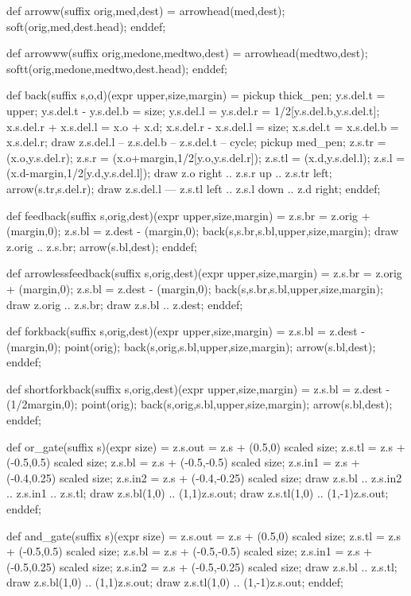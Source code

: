def arroww(suffix orig,med,dest) =
 arrowhead(med,dest); soft(orig,med,dest.head);
enddef;

def arrowww(suffix orig,medone,medtwo,dest) =
 arrowhead(medtwo,dest); softt(orig,medone,medtwo,dest.head);
enddef;

def back(suffix s,o,d)(expr upper,size,margin) =
 pickup thick_pen;
 y.s.del.t = upper; y.s.del.t - y.s.del.b = size;
 y.s.del.l = y.s.del.r = 1/2[y.s.del.b,y.s.del.t];
 x.s.del.r + x.s.del.l = x.o + x.d;
 x.s.del.r - x.s.del.l = size;
 x.s.del.t = x.s.del.b = x.s.del.r;
 draw z.s.del.l -- z.s.del.b -- z.s.del.t -- cycle;
 pickup med_pen;
 z.s.tr = (x.o,y.s.del.r);
 z.s.r =  (x.o+margin,1/2[y.o,y.s.del.r]);
 z.s.tl = (x.d,y.s.del.l);
 z.s.l =  (x.d-margin,1/2[y.d,y.s.del.l]);
 draw z.o {right} .. z.s.r {up} .. z.s.tr {left};
 arrow(s.tr,s.del.r);
 draw z.s.del.l --- z.s.tl {left} .. z.s.l {down} .. z.d {right};
enddef;

def feedback(suffix s,orig,dest)(expr upper,size,margin) =
 z.s.br = z.orig + (margin,0); z.s.bl = z.dest - (margin,0);
 back(s,s.br,s.bl,upper,size,margin);
 draw z.orig .. z.s.br; arrow(s.bl,dest);
enddef;

def arrowlessfeedback(suffix s,orig,dest)(expr upper,size,margin) =
 z.s.br = z.orig + (margin,0); z.s.bl = z.dest - (margin,0);
 back(s,s.br,s.bl,upper,size,margin);
 draw z.orig .. z.s.br; draw z.s.bl .. z.dest;
enddef;

def forkback(suffix s,orig,dest)(expr upper,size,margin) =
 z.s.bl = z.dest - (margin,0); point(orig);
 back(s,orig,s.bl,upper,size,margin); arrow(s.bl,dest);
enddef;

def shortforkback(suffix s,orig,dest)(expr upper,size,margin) =
 z.s.bl = z.dest - (1/2margin,0); point(orig);
 back(s,orig,s.bl,upper,size,margin); arrow(s.bl,dest);
enddef;


def or_gate(suffix s)(expr size) =
 z.s.out = z.s + (0.5,0) scaled size;
 z.s.tl = z.s + (-0.5,0.5) scaled size;
 z.s.bl = z.s + (-0.5,-0.5) scaled size;
 z.s.in1 = z.s + (-0.4,0.25) scaled size;
 z.s.in2 = z.s + (-0.4,-0.25) scaled size;
 draw z.s.bl .. z.s.in2 .. z.s.in1 .. z.s.tl;
 draw z.s.bl{(1,0)} .. {(1,1)}z.s.out;
 draw z.s.tl{(1,0)} .. {(1,-1)}z.s.out;
enddef;

def and_gate(suffix s)(expr size)  =
 z.s.out = z.s + (0.5,0) scaled size;
 z.s.tl = z.s + (-0.5,0.5) scaled size;
 z.s.bl = z.s + (-0.5,-0.5) scaled size;
 z.s.in1 = z.s + (-0.5,0.25) scaled size;
 z.s.in2 = z.s + (-0.5,-0.25) scaled size;
 draw z.s.bl .. z.s.tl;
 draw z.s.bl{(1,0)} .. {(1,1)}z.s.out;
 draw z.s.tl{(1,0)} .. {(1,-1)}z.s.out;
enddef;

